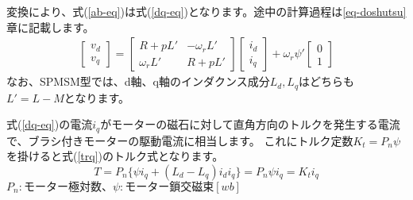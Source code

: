 変換により、式(\ref{ab-eq})は式(\ref{dq-eq})となります。途中の計算過程は\ref{eq-doshutsu}章に記載します。
{\large
\begin{align}
    \begin{bmatrix}
        v_{d} \\
        v_{q}
    \end{bmatrix}
    =
    \begin{bmatrix}
        R+pL' & -\omega_{r}L' \\
        \omega_{r}L' & R+pL'
    \end{bmatrix}
    \begin{bmatrix}
        i_{d} \\
        i_{q}
    \end{bmatrix}
    + \omega_{r}\psi'
    \begin{bmatrix}
        0 \\
        1
    \end{bmatrix}
    \label{dq-eq}
\end{align}
}
なお、SPMSM型では、d軸、q軸のインダクンス成分$L_{d},L_{q}$はどちらも$L'=L-M$となります。

式(\ref{dq-eq})の電流$i_{q}$がモーターの磁石に対して直角方向のトルクを発生する電流で、ブラシ付きモーターの駆動電流に相当します。
これにトルク定数$K_{t}=P_{n}\psi$を掛けると式(\ref{trq})のトルク式となります。
{\large
\begin{equation}\label{trq}
T=P_{n}\{\psi i_{q}+(L_{d}-L_{q})i_{d}i_{q}\} = P_{n}\psi i_{q} = K_{t}i_{q}
\end{equation}
$P_{n}:モーター極対数、\psi:モーター鎖交磁束[wb]$
}
